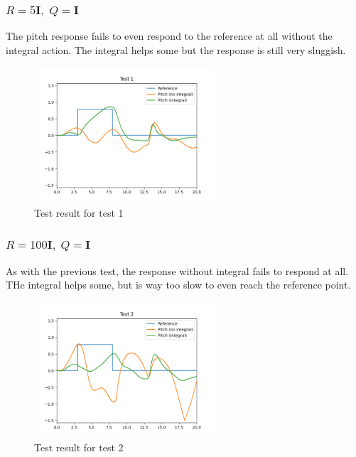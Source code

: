 \subsubsection{$R = 5\mathbf{I},\; Q=\mathbf{I}$}
The pitch response fails to even respond to the reference at all without the integral action. The integral helps some but the response is still very sluggish.
\begin{figure}[H]
	\centering
	\includegraphics[width=0.6\textwidth]{figures/lab2-test1.png}
	\caption{Test result for test 1}
	\label{}
\end{figure}


\subsubsection{$R = 100\mathbf{I},\; Q=\mathbf{I}$}
As with the previous test, the response without integral fails to respond at all. THe integral helps some, but is way too slow to even reach the reference point.
\begin{figure}[H]
	\centering
	\includegraphics[width=0.6\textwidth]{figures/lab2-test2.png}
	\caption{Test result for test 2}
	\label{}
\end{figure}

